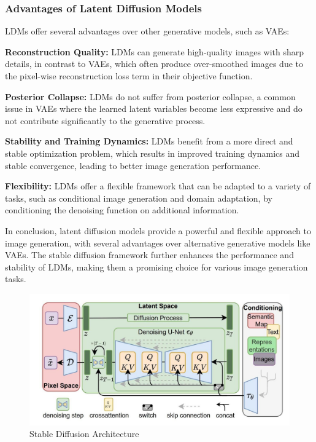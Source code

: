 \documentclass[12pt]{article}
\begin{document}
\subsubsection{Advantages of Latent Diffusion Models}

LDMs offer several advantages over other generative models, such as VAEs:

\textbf{Reconstruction Quality:} LDMs can generate high-quality images with sharp details, in contrast to VAEs, which often produce over-smoothed images due to the pixel-wise reconstruction loss term in their objective function.

\textbf{Posterior Collapse:} LDMs do not suffer from posterior collapse, a common issue in VAEs where the learned latent variables become less expressive and do not contribute significantly to the generative process.

\textbf{Stability and Training Dynamics:} LDMs benefit from a more direct and stable optimization problem, which results in improved training dynamics and stable convergence, leading to better image generation performance.

\textbf{Flexibility:} LDMs offer a flexible framework that can be adapted to a variety of tasks, such as conditional image generation and domain adaptation, by conditioning the denoising function on additional information.

In conclusion, latent diffusion models provide a powerful and flexible approach to image generation, with several advantages over alternative generative models like VAEs. The stable diffusion framework further enhances the performance and stability of LDMs, making them a promising choice for various image generation tasks.

\begin{figure}[h]
    \centering
    \includegraphics[scale=0.45]{./media/stablediff.jpeg}
    \caption{Stable Diffusion Architecture}
    \label{fig:stable_diff}
\end{figure}
\end{document}
